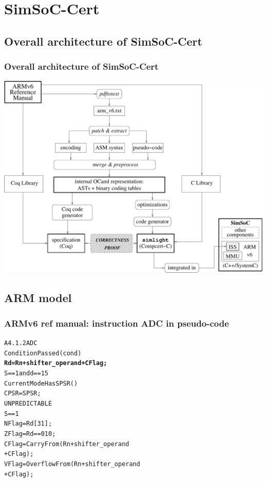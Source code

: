 \documentclass{beamer} %
\begin{document}
\section{SimSoC-Cert}


\subsection{Overall architecture of SimSoC-Cert}
\begin{frame}
\frametitle{Overall architecture of SimSoC-Cert}
\hfil\includegraphics[width=.8\linewidth]{fullarchi.pdf}
\end{frame}

\subsection{ARM model}

\begin{frame}[fragile]
\frametitle{ARMv6 ref manual: instruction ADC in pseudo-code}
\begin{alltt}
A4.1.2 ADC
   ConditionPassed(cond) 
    \textbf{Rd = Rn + shifter_operand + C Flag;}
     S == 1 and d == 15 
       CurrentModeHasSPSR() 
          CPSR = SPSR;
       UNPREDICTABLE
      S == 1 
      N Flag = Rd[31];
      Z Flag =  Rd == 0  1  0;
      C Flag = CarryFrom(Rn + shifter_operand
                            + C Flag);
      V Flag = OverflowFrom(Rn + shifter_operand
                               + C Flag);

\end{alltt}
\end{frame}
\end{document}
